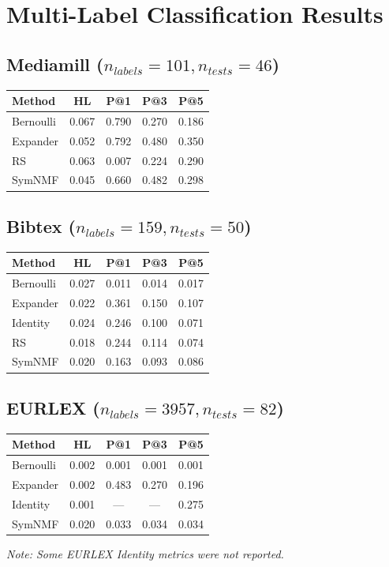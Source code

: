 \documentclass{article}
\begin{document}
\section*{Multi-Label Classification Results}

\subsection*{Mediamill ($n_{labels}=101,n_{tests}=46$)}

\begin{tabular}{lcccc}
\toprule
Method & HL & P@1 & P@3 & P@5 \\
\midrule
Bernoulli & 0.067 & 0.790 & 0.270 & 0.186 \\
Expander  & 0.052 & 0.792 & 0.480 & 0.350 \\
RS        & 0.063 & 0.007 & 0.224 & 0.290 \\
SymNMF    & 0.045 & 0.660 & 0.482 & 0.298 \\
\bottomrule
\end{tabular}

\vspace{1cm}

\subsection*{Bibtex ($n_{labels}=159,n_{tests}=50$)}

\begin{tabular}{lcccc}
\toprule
Method & HL & P@1 & P@3 & P@5 \\
\midrule
Bernoulli & 0.027 & 0.011 & 0.014 & 0.017 \\
Expander  & 0.022 & 0.361 & 0.150 & 0.107 \\
Identity  & 0.024 & 0.246 & 0.100 & 0.071 \\
RS        & 0.018 & 0.244 & 0.114 & 0.074 \\
SymNMF    & 0.020 & 0.163 & 0.093 & 0.086 \\
\bottomrule
\end{tabular}

\vspace{1cm}

\subsection*{EURLEX ($n_{labels}=3957,n_{tests}=82$)}

\begin{tabular}{lcccc}
\toprule
Method & HL & P@1 & P@3 & P@5 \\
\midrule
Bernoulli & 0.002 & 0.001 & 0.001 & 0.001 \\
Expander  & 0.002 & 0.483 & 0.270 & 0.196 \\
Identity  & 0.001 & ---   & ---   & 0.275   \\

SymNMF    & 0.020 & 0.033 & 0.034 & 0.034 \\
\bottomrule
\end{tabular}

\vspace{0.5cm}
\textit{Note: Some EURLEX Identity metrics were not reported.}
\end{document}
